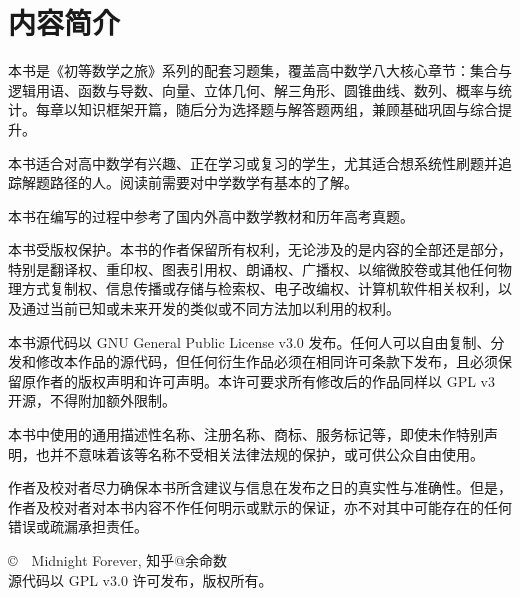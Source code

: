 
\chapter*{内容简介}

本书是《初等数学之旅》系列的配套习题集，覆盖高中数学八大核心章节：集合与逻辑用语、函数与导数、向量、立体几何、解三角形、圆锥曲线、数列、概率与统计。每章以知识框架开篇，随后分为选择题与解答题两组，兼顾基础巩固与综合提升。

本书适合对高中数学有兴趣、正在学习或复习的学生，尤其适合想系统性刷题并追踪解题路径的人。阅读前需要对中学数学有基本的了解。

本书在编写的过程中参考了国内外高中数学教材和历年高考真题。

\vfill

\begin{flushleft}
  \kaishu\small
  本书受版权保护。本书的作者保留所有权利，无论涉及的是内容的全部还是部分，特别是翻译权、重印权、图表引用权、朗诵权、广播权、以缩微胶卷或其他任何物理方式复制权、信息传播或存储与检索权、电子改编权、计算机软件相关权利，以及通过当前已知或未来开发的类似或不同方法加以利用的权利。

  \vspace{1em}

  本书源代码以 GNU General Public License v3.0 发布。任何人可以自由复制、分发和修改本作品的源代码，但任何衍生作品必须在相同许可条款下发布，且必须保留原作者的版权声明和许可声明。本许可要求所有修改后的作品同样以 GPL v3 开源，不得附加额外限制。

  \vspace{1em}

  本书中使用的通用描述性名称、注册名称、商标、服务标记等，即使未作特别声明，也并不意味着该等名称不受相关法律法规的保护，或可供公众自由使用。

  \vspace{1em}

  作者及校对者尽力确保本书所含建议与信息在发布之日的真实性与准确性。但是，作者及校对者对本书内容不作任何明示或默示的保证，亦不对其中可能存在的任何错误或疏漏承担责任。
  \vspace{2em}

  \copyright~\the\year~Midnight Forever, 知乎@余命数 \\
  源代码以 GPL v3.0 许可发布，版权所有。
\end{flushleft}

\vspace*{\fill}
\clearpage

\cleardoublepage
